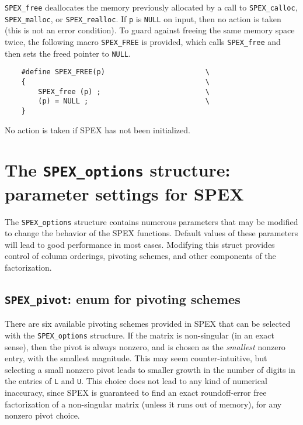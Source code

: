 \documentclass[12pt]{report}
\theoremstyle{definition}
\begin{document}
\verb|SPEX_free| deallocates the memory previously allocated by a call to
\verb|SPEX_calloc|, \verb|SPEX_malloc|, or \verb|SPEX_realloc|.  If \verb|p| is
\verb|NULL| on input, then no action is taken (this is not an error condition).
To guard against freeing the same memory space twice, the following macro
\verb|SPEX_FREE| is provided, which calls \verb|SPEX_free| and then sets the
freed pointer to \verb|NULL|.

\begin{mdframed}[userdefinedwidth=6in]
{\footnotesize
\begin{verbatim}
    #define SPEX_FREE(p)                        \
    {                                           \
        SPEX_free (p) ;                         \
        (p) = NULL ;                            \
    }
\end{verbatim}
} \end{mdframed}

No action is taken if SPEX has not been initialized.

\cprotect\section{The \verb|SPEX_options| structure:
parameter settings for SPEX} \label{ss:SPEX_options}

The \verb|SPEX_options| structure contains numerous parameters that may be
modified to change the behavior of the SPEX functions.  Default values of
these parameters will lead to good performance in most cases.  Modifying this
struct provides control of column orderings, pivoting schemes, and other
components of the factorization.

\cprotect\subsection{\verb|SPEX_pivot|: enum for pivoting schemes}
\label{ss:SPEX_pivot}

There are six available pivoting schemes provided in SPEX that can be
selected with the \verb|SPEX_options| structure.  If the matrix is non-singular
(in an exact sense), then the pivot is always nonzero, and is chosen as the
{\em smallest} nonzero entry, with the smallest magnitude.  This may seem
counter-intuitive, but selecting a small nonzero pivot leads to smaller growth
in the number of digits in the entries of \verb|L| and \verb|U|.  This choice
does not lead to any kind of numerical inaccuracy, since SPEX is guaranteed
to find an exact roundoff-error free factorization of a non-singular matrix
(unless it runs out of memory), for any nonzero pivot choice.
\end{document}
